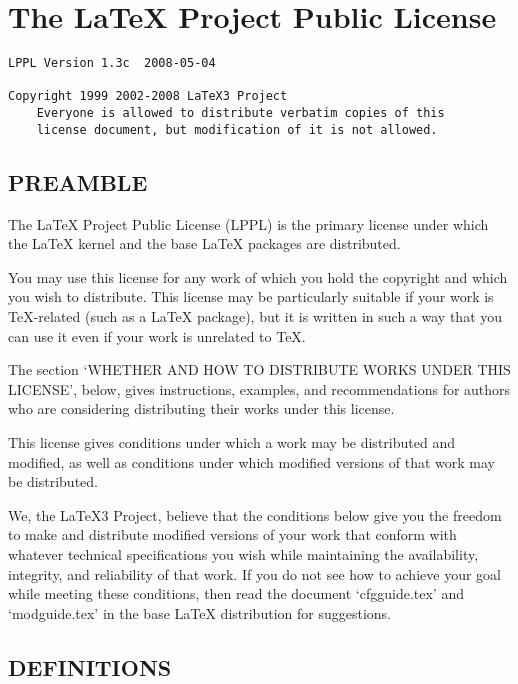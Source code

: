 \section{The LaTeX Project Public License}
\begin{lstlisting}
LPPL Version 1.3c  2008-05-04

Copyright 1999 2002-2008 LaTeX3 Project
    Everyone is allowed to distribute verbatim copies of this
    license document, but modification of it is not allowed.
\end{lstlisting}


\subsection{PREAMBLE}

The LaTeX Project Public License (LPPL) is the primary license under
which the LaTeX kernel and the base LaTeX packages are distributed.

You may use this license for any work of which you hold the copyright
and which you wish to distribute.  This license may be particularly
suitable if your work is TeX-related (such as a LaTeX package), but 
it is written in such a way that you can use it even if your work is 
unrelated to TeX.

The section `WHETHER AND HOW TO DISTRIBUTE WORKS UNDER THIS LICENSE',
below, gives instructions, examples, and recommendations for authors
who are considering distributing their works under this license.

This license gives conditions under which a work may be distributed
and modified, as well as conditions under which modified versions of
that work may be distributed.

We, the LaTeX3 Project, believe that the conditions below give you
the freedom to make and distribute modified versions of your work
that conform with whatever technical specifications you wish while
maintaining the availability, integrity, and reliability of
that work.  If you do not see how to achieve your goal while
meeting these conditions, then read the document `cfgguide.tex'
and `modguide.tex' in the base LaTeX distribution for suggestions.


\subsection{DEFINITIONS}

